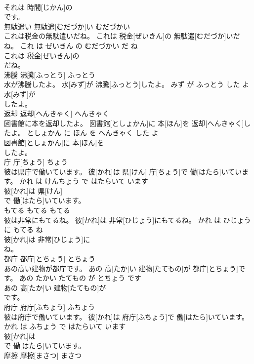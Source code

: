 \documentclass[8pt]{extreport}
\begin{document}
\begin{CJK}{UTF8}{min}
\\	それは 時間[じかん]の
\\	です。			
\\	無駄遣い	無駄遣[むだづか]い	むだづかい	
\\	これは税金の無駄遣いだね。	これは 税金[ぜいきん]の 無駄遣[むだづか]いだね。	これ は ぜいきん の むだづかい だ ね	
\\	これは 税金[ぜいきん]の
\\	だね。			
\\	沸騰	沸騰[ふっとう]	ふっとう	
\\	水が沸騰したよ。	水[みず]が 沸騰[ふっとう]したよ。	みず が ふっとう した よ	
\\	水[みず]が
\\	したよ。			
\\	返却	返却[へんきゃく]	へんきゃく	
\\	図書館に本を返却したよ。	図書館[としょかん]に 本[ほん]を 返却[へんきゃく]したよ。	としょかん に ほん を へんきゃく した よ	
\\	図書館[としょかん]に 本[ほん]を
\\	したよ。			
\\	庁	庁[ちょう]	ちょう	
\\	彼は県庁で働いています。	彼[かれ]は 県[けん] 庁[ちょう]で 働[はたら]いています。	かれ は けんちょう で はたらいて います	
\\	彼[かれ]は 県[けん]
\\	で 働[はたら]いています。			
\\	もてる	もてる	もてる	
\\	彼は非常にもてるね。	彼[かれ]は 非常[ひじょう]にもてるね。	かれ は ひじょう に もてる ね	
\\	彼[かれ]は 非常[ひじょう]に
\\	ね。			
\\	都庁	都庁[とちょう]	とちょう	
\\	あの高い建物が都庁です。	あの 高[たか]い 建物[たてもの]が 都庁[とちょう]です。	あの たかい たてもの が とちょう です	
\\	あの 高[たか]い 建物[たてもの]が
\\	です。			
\\	府庁	府庁[ふちょう]	ふちょう	
\\	彼は府庁で働いています。	彼[かれ]は 府庁[ふちょう]で 働[はたら]いています。	かれ は ふちょう で はたらいて います	
\\	彼[かれ]は
\\	で 働[はたら]いています。			
\\	摩擦	摩擦[まさつ]	まさつ	

\end{CJK}
\end{document}
